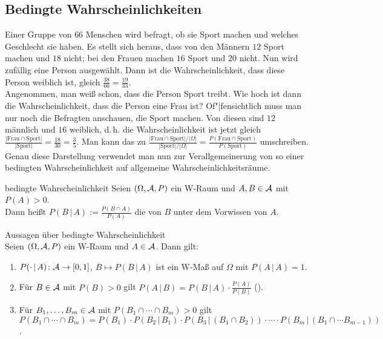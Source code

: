 \subsection{%
    Bedingte Wahrscheinlichkeiten%
}

\begin{Bsp}
    Einer Gruppe von $66$ Menschen wird befragt, ob sie Sport machen und
    welches Geschlecht sie haben.
    Es stellt sich heraus, dass von den Männern $12$ Sport machen und $18$ nicht;
    bei den Frauen machen $16$ Sport und $20$ nicht.
    Nun wird zufällig eine Person ausgewählt.
    Dann ist die Wahrscheinlichkeit, dass diese Person weiblich ist, gleich
    $\frac{38}{66} = \frac{19}{33}$.\\
    Angenommen, man weiß schon, dass die Person Sport treibt.
    Wie hoch ist dann die Wahrscheinlichkeit, dass die Person eine Frau ist?
    Of"|fensichtlich muss man nur noch die Befragten anschauen, die Sport machen.
    Von diesen sind $12$ männlich und $16$ weiblich, d.\,h. die Wahrscheinlichkeit ist jetzt
    gleich $\frac{|\text{Frau} \cap \text{Sport}|}{|\text{Sport}|} = \frac{18}{30} = \frac{3}{5}$.
    Man kann das zu $\frac{|\text{Frau} \cap \text{Sport}|/|\Omega|}{|\text{Sport}|/|\Omega|} =
    \frac{P(\text{Frau} \cap \text{Sport})}{P(\text{Sport})}$ umschreiben.
    Genau diese Darstellung verwendet man nun zur Verallgemeinerung von so einer
    bedingten Wahrscheinlichkeit auf allgemeine Wahrscheinlichkeitsräume.
\end{Bsp}

\linie

\begin{Def}{bedingte Wahrscheinlichkeit}
    Seien $(\Omega, \mathcal{A}, P)$ ein W-Raum und $A, B \in \mathcal{A}$ mit $P(A) > 0$.\\
    Dann heißt $P(B \,|\, A) := \frac{P(B \cap A)}{P(A)}$ die 
    von $B$ unter dem Vorwissen von $A$.
\end{Def}

\begin{Satz}{Aussagen über bedingte Wahrscheinlichkeit}\\
    Seien $(\Omega, \mathcal{A}, P)$ ein W-Raum und $A \in \mathcal{A}$.
    Dann gilt:
    \begin{enumerate}
        \item
        $P(\cdot \,|\, A)\colon \mathcal{A} \rightarrow [0, 1]$, $B \mapsto P(B \,|\, A)$ ist ein W-Maß
        auf $\Omega$ mit $P(A \,|\, A) = 1$.

        \item
        Für $B \in \mathcal{A}$ mit $P(B) > 0$ gilt
        $P(A \,|\, B) = P(B \,|\, A) \cdot \frac{P(A)}{P(B)}$
        ().

        \item
        Für $B_1, \dotsc, B_m \in \mathcal{A}$ mit $P(B_1 \cap \dotsb \cap B_m) > 0$ gilt\\
        $P(B_1 \cap \dotsb \cap B_m) = P(B_1) \cdot P(B_2 \,|\, B_1) \cdot
        P(B_3 \,|\, (B_1 \cap B_2)) \cdot \dotsm \cdot
        P(B_m \,|\, (B_1 \cap \dotsb B_{m-1}))$.
    \end{enumerate}
\end{Satz}

